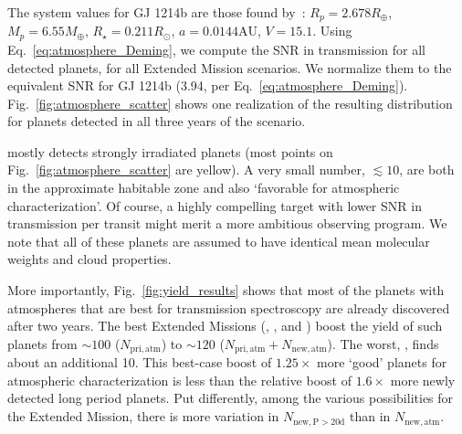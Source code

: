 \begin{enumerate}
	The system values for GJ 1214b are those found
	by~\citet{charbonneau_gj1214b_2009}: $R_p = 2.678R_\oplus$, $M_p = 6.55M_\oplus$,
	$R_\star = 0.211R_\odot$, $a = 0.0144\mathrm{AU}$, $V = 15.1$.
	Using Eq.~\ref{eq:atmosphere_Deming}, we compute the SNR in transmission for 
	all detected planets, for all Extended Mission scenarios.
	We normalize them to the equivalent SNR for GJ 1214b (3.94, per 
	Eq.~\ref{eq:atmosphere_Deming}).
	Fig.~\ref{fig:atmosphere_scatter} shows one realization of the resulting 
	distribution for planets detected in all three years of the \npole\:scenario.

	\tess mostly detects strongly irradiated planets (most points on Fig.~\ref{fig:atmosphere_scatter} are yellow).
	A very small number, $\lesssim 10$, are both in the approximate habitable zone and also `favorable for atmospheric characterization'.
	Of course, a highly compelling target with lower SNR in transmission per transit might merit a more ambitious \jwst observing program.
	We note that all of these planets are assumed to have identical mean molecular weights and cloud properties.

	More importantly, Fig.~\ref{fig:yield_results} shows that most of the planets with atmospheres that are best for transmission spectroscopy are already discovered after two years.
	The best Extended Missions (\shemiAvoid, \elong, \eshort\:and \hemis) boost 
	the yield of such planets from $\sim\!100$ ($N_\mathrm{pri,atm}$) to 
	$\sim\!120$ ($N_\mathrm{pri,atm} + N_\mathrm{new,atm}$).
	The worst, \npole, finds about an additional 10.
	This best-case boost of $1.25\times$ more `good' planets for atmospheric characterization is less than the relative boost of $1.6\times$ more newly detected long period planets.
	Put differently, among the various possibilities for the Extended Mission,
        there is more variation in $N_\mathrm{new,P>20d}$ than in 
        $N_\mathrm{new,atm}$.
	

\end{enumerate}
